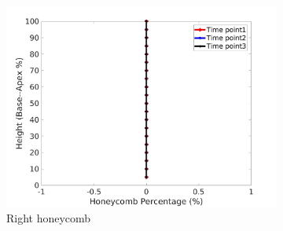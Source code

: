 \begin{figure}[H]
\begin{subfigure}{.42\linewidth}
  \includegraphics[width=\linewidth,trim={{.0\wd0} {.0\wd0} {.0\wd0} {.0\wd0}},clip]{Appendix/Image_AppexA/BaseToApex/IPF9RightLungHoneycombDiseaseAgainstHeight.jpg}
  \caption{Right honeycomb}
  \label{fig:IPF9DiseaseAgainstHeight-f}
\end{subfigure}
\begin{subfigure}{.42\linewidth}%

\end{subfigure}
\end{figure}
